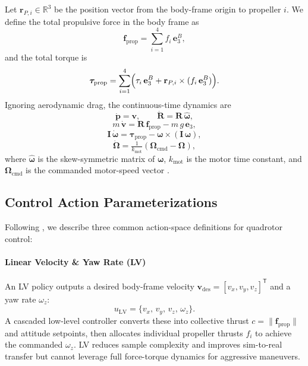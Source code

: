 Let \(\mathbf{r}_{P,i}\in \mathbb{R}^{3}\) be the position vector from the body-frame origin to propeller \(i\). We define the total propulsive force in the body frame as
\begin{equation}
\mathbf{f}_{\mathrm{prop}} = \sum_{i=1}^4 f_i\,\mathbf{e}_3^B,
\end{equation}
and the total torque is
\begin{equation}
\boldsymbol{\tau}_{\mathrm{prop}} = \sum_{i=1}^4 \Bigl(\tau_i\,\mathbf{e}_3^B + \mathbf{r}_{P,i}\times(f_i\,\mathbf{e}_3^B)\Bigr).
\end{equation}
Ignoring aerodynamic drag, the continuous-time dynamics are
\begin{equation}
\dot{\mathbf{p}} = \mathbf{v}, 
\qquad
\dot{\mathbf{R}} = \mathbf{R}\,\widehat{\boldsymbol{\omega}},
\end{equation}
\begin{equation}
m\,\dot{\mathbf{v}} = \mathbf{R}\,\mathbf{f}_{\mathrm{prop}} - m\,g\,\mathbf{e}_3,
\end{equation}
\begin{equation}
\mathbf{I}\,\dot{\boldsymbol{\omega}} = \boldsymbol{\tau}_{\mathrm{prop}} - \boldsymbol{\omega} \times (\mathbf{I}\,\boldsymbol{\omega}),
\end{equation}
\begin{equation}
\dot{\boldsymbol{\Omega}} = \tfrac{1}{k_{\mathrm{mot}}}(\boldsymbol{\Omega}_{\mathrm{cmd}} - \boldsymbol{\Omega}),
\end{equation}
where \(\widehat{\boldsymbol{\omega}}\) is the skew-symmetric matrix of \(\boldsymbol{\omega}\), \(k_{\mathrm{mot}}\) is the motor time constant, and \(\boldsymbol{\Omega}_{\mathrm{cmd}}\) is the commanded motor-speed vector \cite{kaufmann_benchmark_2022}.

\subsection{Control Action Parameterizations}
\label{sec:quadrotor_actions}
Following \cite{kaufmann_benchmark_2022}, we describe three common action-space definitions for quadrotor control:

\paragraph{Linear Velocity \& Yaw Rate (LV)}  
An LV policy outputs a desired body-frame velocity \(\mathbf{v}_{\mathrm{des}}=[v_x,v_y,v_z]^\mathsf{T}\) and a yaw rate \(\omega_z\):
\begin{equation}
u_{\mathrm{LV}} = \{v_x,\,v_y,\,v_z,\,\omega_z\}.
\end{equation}
A cascaded low-level controller converts these into collective thrust \(c=\|\mathbf{f}_{\mathrm{prop}}\|\) and attitude setpoints, then allocates individual propeller thrusts \(f_i\) to achieve the commanded \(\omega_z\). LV reduces sample complexity and improves sim-to-real transfer but cannot leverage full force-torque dynamics for aggressive maneuvers.

